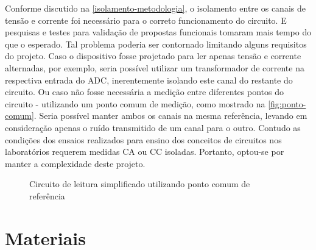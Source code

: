 Conforme discutido na \autoref{isolamento-metodologia}, o isolamento entre os canais de tensão e corrente foi necessário para o correto funcionamento do circuito. E pesquisas e testes para validação de propostas funcionais tomaram mais tempo do que o esperado.
Tal problema poderia ser contornado limitando alguns requisitos do projeto. 
Caso o dispositivo fosse projetado para ler apenas tensão e corrente alternadas, por exemplo, seria possível utilizar um transformador de corrente na respectiva entrada do \gls{ADC}, inerentemente isolando este canal do restante do circuito. 
Ou caso não fosse necessária a medição entre diferentes pontos do circuito - utilizando um ponto comum de medição, como mostrado na \autoref{fig:ponto-comum}. Seria possível manter ambos os canais na mesma referência, levando em consideração apenas o ruído transmitido de um canal para o outro. Contudo as condições dos ensaios realizados para ensino dos conceitos de circuitos nos laboratórios requerem medidas \gls{CA} ou \gls{CC} isoladas. Portanto, optou-se por manter a complexidade deste projeto.

\begin{figure}[h!]
    \centering
    \caption{Circuito de leitura simplificado utilizando ponto comum de referência}
    \label{fig:ponto-comum}
    \fonte{}
\end{figure}

\section{Materiais}\label{sec:materiais}

